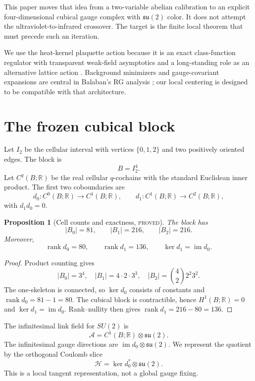 \documentclass[11pt]{article}
\newcommand{\proved}{\textcolor{provedgreen}{\textsc{proved}}}
\newcommand{\R}{\mathbb R}
\newcommand{\rank}{\operatorname{rank}}
\newcommand{\im}{\operatorname{im}}
\newcommand{\su}{\mathfrak{su}(2)}
\newtheorem{proposition}[definition]{Proposition}
\theoremstyle{remark}
\begin{document}
This paper moves that idea from a two-variable abelian calibration to an
explicit four-dimensional cubical gauge complex with $\su$ color.  It does not
attempt the ultraviolet-to-infrared crossover.  The target is the finite local
theorem that must precede such an iteration.

We use the heat-kernel plaquette action because it is an exact class-function
regulator with transparent weak-field asymptotics and a long-standing role as
an alternative lattice action \cite{MenottiOnofri}.  Background minimizers and
gauge-covariant expansions are central in Balaban's RG analysis
\cite{BalabanBackground,BalabanPropagators}; our local centering is designed to
be compatible with that architecture.

\section{The frozen cubical block}

Let $I_2$ be the cellular interval with vertices $\{0,1,2\}$ and two positively
oriented edges.  The block is
\[
 B=I_2^4.
\]
Let $C^q(B;\R)$ be the real cellular $q$-cochains with the standard Euclidean
inner product.  The first two coboundaries are
\[
 d_0:C^0(B;\R)\longrightarrow C^1(B;\R),
 \qquad
 d_1:C^1(B;\R)\longrightarrow C^2(B;\R),
\]
with $d_1d_0=0$.

\begin{proposition}[Cell counts and exactness, \proved]\label{prop:counts}
The block has
\[
 |B_0|=81,\qquad |B_1|=216,\qquad |B_2|=216.
\]
Moreover,
\[
 \rank d_0=80,
 \qquad \rank d_1=136,
 \qquad \ker d_1=\im d_0.
\]
\end{proposition}
\begin{proof}
Product counting gives
\[
 |B_0|=3^4,
 \quad |B_1|=4\cdot2\cdot3^3,
 \quad |B_2|=\binom42 2^2 3^2.
\]
The one-skeleton is connected, so $\ker d_0$ consists of constants and
$\rank d_0=81-1=80$.  The cubical block is contractible, hence
$H^1(B;\R)=0$ and $\ker d_1=\im d_0$.  Rank--nullity then gives
$\rank d_1=216-80=136$.
\end{proof}

The infinitesimal link field for $SU(2)$ is
\[
 \mathcal A=C^1(B;\R)\otimes\su.
\]
The infinitesimal gauge directions are $\im d_0\otimes\su$.  We represent the
quotient by the orthogonal Coulomb slice
\begin{equation}\label{eq:H}
 \mathcal H=\ker d_0^*\otimes\su.
\end{equation}
This is a local tangent representation, not a global gauge fixing.
\end{document}
